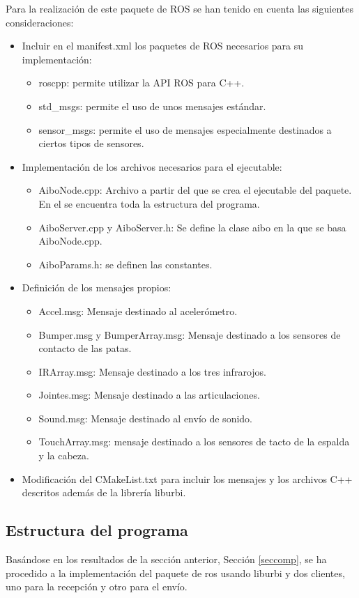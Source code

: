 \documentclass[12pt,a4paper,final,twoside]{book}
\begin{document}
Para la realización de este paquete de ROS se han tenido en cuenta las siguientes consideraciones:
\begin{itemize}
\item Incluir en el manifest.xml los paquetes de ROS necesarios para su implementación:
\begin{itemize}
\item roscpp: permite utilizar la API ROS para C++.
\item std{\_}msgs: permite el uso de unos mensajes estándar.
\item sensor{\_}msgs: permite el uso de mensajes especialmente destinados a ciertos tipos de sensores.
\end{itemize}
\item Implementación de los archivos necesarios para el ejecutable:
\begin{itemize}
\item AiboNode.cpp: Archivo a partir del que se crea el ejecutable del paquete. En el se encuentra toda la estructura del programa.
\item AiboServer.cpp y AiboServer.h: Se define la clase aibo en la que se basa AiboNode.cpp.
\item AiboParams.h: se definen las constantes.
\end{itemize} 
\item Definición de los mensajes propios:
\begin{itemize}
\item Accel.msg: Mensaje destinado al acelerómetro.
\item Bumper.msg y BumperArray.msg: Mensaje destinado a los sensores de contacto de las patas.
\item IRArray.msg: Mensaje destinado a los tres infrarojos.
\item Jointes.msg: Mensaje destinado a las articulaciones.
\item Sound.msg: Mensaje destinado al envío de sonido.
\item TouchArray.msg: mensaje destinado a los sensores de tacto de la espalda y la cabeza.
\end{itemize}
\item Modificación del CMakeList.txt para incluir los mensajes y los archivos C++ descritos además de la librería liburbi.
\end{itemize}

\subsection{Estructura del programa}
Basándose en los resultados de la sección anterior, Sección \ref{seccomp}, se ha procedido a la implementación del paquete de ros usando liburbi y dos clientes, uno para la recepción  y otro para el envío.
\end{document}
